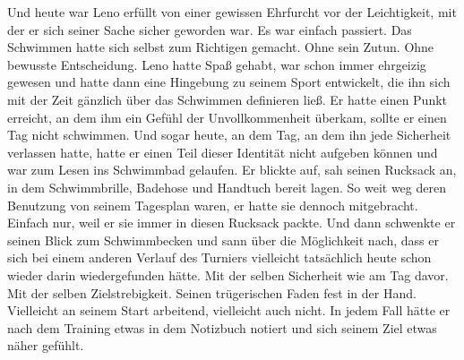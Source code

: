 \documentclass[ngerman,smalldemyvopaper,11pt,oneside,onecolumn,openright,extrafontsizes]{memoir}
\begin{document}
Und heute war Leno erfüllt von einer gewissen Ehrfurcht vor der Leichtigkeit, mit der er sich seiner Sache sicher geworden war. Es war einfach passiert. Das Schwimmen hatte sich selbst zum Richtigen gemacht. Ohne sein Zutun. Ohne bewusste Entscheidung. Leno hatte Spaß gehabt, war schon immer ehrgeizig gewesen und hatte dann eine Hingebung zu seinem Sport entwickelt, die ihn sich mit der Zeit gänzlich über das Schwimmen definieren ließ. Er hatte einen Punkt erreicht, an dem ihm ein Gefühl der Unvollkommenheit überkam, sollte er einen Tag nicht schwimmen. Und sogar heute, an dem Tag, an dem ihn jede Sicherheit verlassen hatte, hatte er einen Teil dieser Identität nicht aufgeben können und war zum Lesen ins Schwimmbad gelaufen. Er blickte auf, sah seinen Rucksack an, in dem Schwimmbrille, Badehose und Handtuch bereit lagen. So weit weg deren Benutzung von seinem Tagesplan waren, er hatte sie dennoch mitgebracht. Einfach nur, weil er sie immer in diesen Rucksack packte. Und dann schwenkte er seinen Blick zum Schwimmbecken und sann über die Möglichkeit nach, dass er sich bei einem anderen Verlauf des Turniers vielleicht tatsächlich heute schon wieder darin wiedergefunden hätte. Mit der selben Sicherheit wie am Tag davor. Mit der selben Zielstrebigkeit. Seinen trügerischen Faden fest in der Hand. Vielleicht an seinem Start arbeitend, vielleicht auch nicht. In jedem Fall hätte er nach dem Training etwas in dem Notizbuch notiert und sich seinem Ziel etwas näher gefühlt.\\
\end{document}
